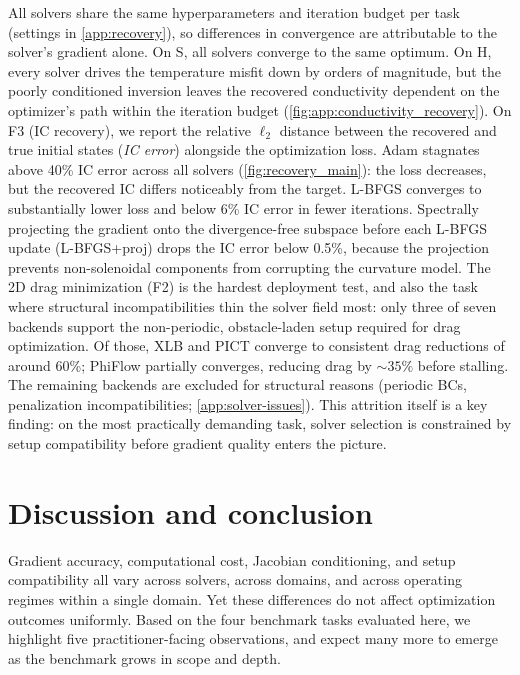 \documentclass{article}
\begin{document}
All solvers share the same hyperparameters and iteration budget per
task (settings in \cref{app:recovery}), so differences in convergence
are attributable to the solver's gradient alone.
On S, all solvers converge to the same optimum. On H, every solver
drives the temperature misfit down by orders of magnitude, but the poorly
conditioned inversion leaves the recovered conductivity dependent on the
optimizer's path within the iteration budget
(\cref{fig:app:conductivity_recovery}).
On F3 (IC recovery), we report the relative $\ell_2$ distance between
the recovered and true initial states (\textit{IC error})
alongside the optimization loss. Adam stagnates
above 40\% IC error across all solvers (\cref{fig:recovery_main}):
the loss decreases, but the recovered IC differs noticeably from the
target.
L-BFGS converges to substantially lower loss and below 6\% IC error in
fewer iterations.
Spectrally projecting the gradient onto the divergence-free subspace
before each L-BFGS update (L-BFGS+proj) drops the IC error below 0.5\%,
because the projection prevents non-solenoidal components from
corrupting the curvature model.
The 2D drag minimization (F2) is the hardest deployment test, and
also the task where structural incompatibilities thin the solver field
most: only three of seven backends support the non-periodic, obstacle-laden
setup required for drag optimization.
Of those, XLB and PICT converge to consistent drag reductions of
around 60\%; PhiFlow partially converges, reducing drag by ${\sim}35\%$
before stalling. The remaining backends are excluded for structural
reasons (periodic BCs, penalization incompatibilities;
\cref{app:solver-issues}). This attrition itself is a key finding:
on the most practically demanding task, solver selection is constrained
by setup compatibility before gradient quality enters the picture.

\section{Discussion and conclusion}
\label{sec:conclusion}

Gradient accuracy, computational cost, Jacobian conditioning, and setup
compatibility all vary across solvers, across domains, and across
operating regimes within a single domain. Yet these differences do not
affect optimization outcomes uniformly. Based on the four benchmark
tasks evaluated here, we highlight five practitioner-facing observations, and
expect many more to emerge as the benchmark grows in scope and depth.
\end{document}
